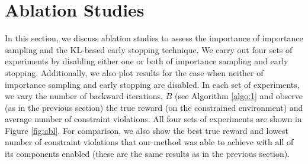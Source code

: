 \documentclass{article}
\begin{document}

\section{Ablation Studies}
In this section, we discuss ablation studies to assess the importance of importance sampling and the KL-based early stopping technique. We carry out four sets of experiments by disabling either one or both of importance sampling and early stopping. Additionally, we also plot results for the case when neither of importance sampling and early stopping are disabled. In each set of experiments, we vary the number of backward iterations, $B$ (see Algorithm \ref{algo:1} and observe (as in the previous section) the true reward (on the constrained environment) and average number of constraint violations. All four sets of experiments are shown in Figure \ref{fig:abl}. For comparison, we also show the best true reward and lowest number of constraint violations that our method was able to achieve with all of its components enabled (these are the same results as in the previous section).
\end{document}
